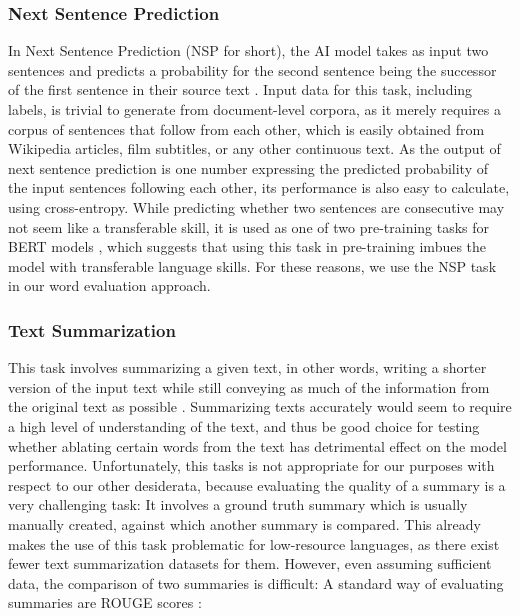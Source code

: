 \subsubsection{Next Sentence Prediction}
In Next Sentence Prediction (NSP for short), the AI model takes as input two sentences and predicts a probability for the second sentence being the successor of the first sentence in their source text \cite{kentonBertPretrainingDeep2019}.
Input data for this task, including labels, is trivial to generate from document-level corpora, as it merely requires a corpus of sentences that follow from each other, which is easily obtained from Wikipedia articles, film subtitles, or any other continuous text.
As the output of next sentence prediction is one number expressing the predicted probability of the input sentences following each other, its performance is also easy to calculate, using cross-entropy.
While predicting whether two sentences are consecutive may not seem like a transferable skill, it is used as one of two pre-training tasks for BERT models \cite{kentonBertPretrainingDeep2019}, which suggests that using this task in pre-training imbues the model with transferable language skills.
For these reasons, we use the NSP task in our word evaluation approach.


\subsubsection{Text Summarization} \label{sec:text-summarization}
This task involves summarizing a given text, in other words, writing a shorter version of the input text while still conveying as much of the information from the original text as possible \cite{radevIntroductionSpecialIssue2002}.
Summarizing texts accurately would seem to require a high level of understanding of the text, and thus be good choice for testing whether ablating certain words from the text has detrimental effect on the model performance.
Unfortunately, this tasks is not appropriate for our purposes with respect to our other desiderata, because evaluating the quality of a summary is a very challenging task:
It involves a ground truth summary which is usually manually created, against which another summary is compared.
This already makes the use of this task problematic for low-resource languages, as there exist fewer text summarization datasets for them.
However, even assuming sufficient data, the comparison of two summaries is difficult:
A standard way of evaluating summaries are ROUGE scores \cite{allahyariTextSummarizationTechniques2017}:

